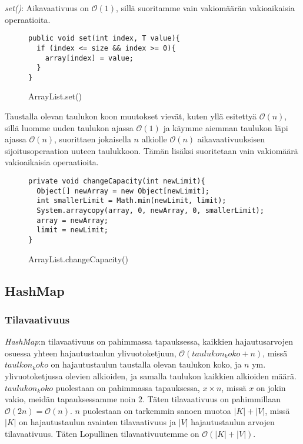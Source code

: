 \documentclass[12pt,a4paper]{article}
\begin{document}
\textit{set()}: Aikavaativuus on $\mathcal{O}(1)$, sillä suoritamme vain vakiomäärän vakioaikaisia operaatioita.
\begin{figure}[H]
\begin{lstlisting}
public void set(int index, T value){
  if (index <= size && index >= 0){
    array[index] = value;
  }
}
\end{lstlisting}
\caption{ArrayList.set()}
\end{figure}

Taustalla olevan taulukon koon muutokset vievät, kuten yllä esitettyä $\mathcal{O}(n)$, sillä luomme uuden taulukon ajassa $\mathcal{O}(1)$ ja käymme aiemman taulukon läpi ajassa $\mathcal{O}(n)$, suorittaen jokaisella $n$ alkiolle $\mathcal{O}(n)$ aikavaativuuksisen sijoitusoperaation uuteen taulukkoon. Tämän lisäksi suoritetaan vain vakiomäärä vakioaikaisia operaatioita.
\begin{figure}[H]
\begin{lstlisting}
private void changeCapacity(int newLimit){
  Object[] newArray = new Object[newLimit];
  int smallerLimit = Math.min(newLimit, limit);
  System.arraycopy(array, 0, newArray, 0, smallerLimit);
  array = newArray;
  limit = newLimit;
}
\end{lstlisting}
\caption{ArrayList.changeCapacity()}
\end{figure}


\pagebreak
\subsection{HashMap}

\subsubsection*{Tilavaativuus}
\textit{HashMap}:n tilavaativuus on pahimmassa tapauksessa, kaikkien hajautusarvojen osuessa yhteen hajautustaulun ylivuotoketjuun, $\mathcal{O}(taulukon_koko + n)$, missä $taulkon_koko$ on hajautustaulun taustalla olevan taulukon koko, ja $n$ ym. ylivuotoketjussa olevien alkioiden, ja samalla taulukon kaikkien alkioiden määrä. $taulukon_koko$ puolestaan on pahimmassa tapauksessa, $x \times n$, missä $x$ on jokin vakio, meidän tapauksessamme noin $2$. Täten tilavaativuus on pahimmillaan $\mathcal{O}(2n) = \mathcal{O}(n)$. $n$ puolestaan on tarkemmin sanoen muotoa $|K| + |V|$, missä $|K|$ on hajautustaulun avainten tilavaativuus ja $|V|$ hajautustaulun arvojen tilavaativuus. Täten Lopullinen tilavaativuutemme on $\mathcal{O}(|K| + |V|)$.
\end{document}
